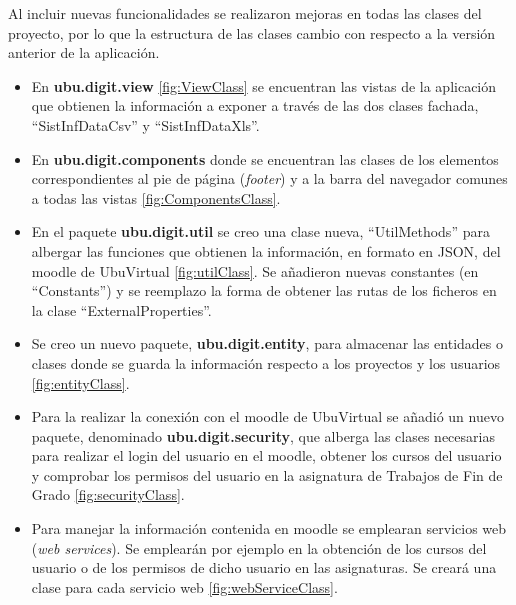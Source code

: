 Al incluir nuevas funcionalidades se realizaron mejoras en todas las clases del proyecto, por lo que la estructura de las clases cambio con respecto a la versión anterior de la aplicación.
\begin{itemize}
	\item En \textbf{ubu.digit.view} \ref{fig:ViewClass} se encuentran las vistas de la aplicación que obtienen la información a exponer a través de las dos clases fachada, ``SistInfDataCsv'' y  ``SistInfDataXls''.
	\item En \textbf{ubu.digit.components} donde se encuentran las clases de los elementos correspondientes al pie de página (\emph{footer}) y a la barra del navegador comunes a todas las vistas \ref{fig:ComponentsClass}. 	
	\item En el paquete \textbf{ubu.digit.util} se creo una clase nueva, ``UtilMethods'' para albergar las funciones que obtienen la información, en formato en JSON, del moodle de UbuVirtual \ref{fig:utilClass}. Se añadieron nuevas constantes (en ``Constants'') y se reemplazo la forma de obtener las rutas de los ficheros en la clase ``ExternalProperties''.	
	\item Se creo un nuevo paquete, \textbf{ubu.digit.entity}, para almacenar las entidades o clases donde se guarda la información respecto a los proyectos y los usuarios \ref{fig:entityClass}. 	
	\item Para la realizar la conexión con el moodle de UbuVirtual se añadió un nuevo paquete, denominado \textbf{ubu.digit.security}, que alberga las clases necesarias para realizar el login del usuario en el moodle, obtener los cursos del usuario y comprobar los permisos del usuario en la asignatura de Trabajos de Fin de Grado \ref{fig:securityClass}. 	
	\item Para manejar la información contenida en moodle se emplearan servicios web (\emph{web services}). Se emplearán por ejemplo en la obtención de los cursos del usuario o de los permisos de dicho usuario en las asignaturas. Se creará una clase para cada servicio web  \ref{fig:webServiceClass}.	
\end{itemize}


